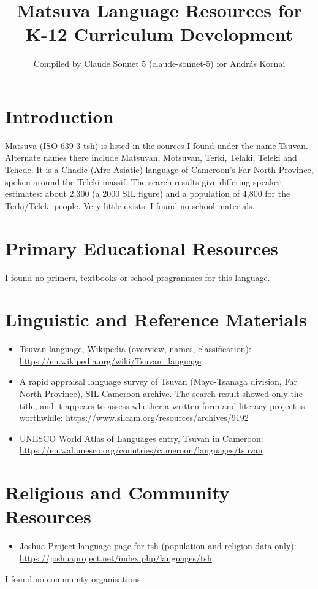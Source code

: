 \documentclass[12pt]{article}
\title{Matsuva Language Resources for K-12 Curriculum Development}
\author{Compiled by Claude Sonnet 5 (claude-sonnet-5) for Andr\'as Kornai}
\date{}
\begin{document}
\maketitle

\section{Introduction}
Matsuva (ISO 639-3 tsh) is listed in the sources I found under the name Tsuvan. Alternate names there include Matsuvan, Motsuvan, Terki, Telaki, Teleki and Tchede. It is a Chadic (Afro-Asiatic) language of Cameroon's Far North Province, spoken around the Teleki massif. The search results give differing speaker estimates: about 2,300 (a 2000 SIL figure) and a population of 4,800 for the Terki/Teleki people. Very little exists. I found no school materials.

\section{Primary Educational Resources}
I found no primers, textbooks or school programmes for this language.

\section{Linguistic and Reference Materials}
\begin{itemize}
\item Tsuvan language, Wikipedia (overview, names, classification): \url{https://en.wikipedia.org/wiki/Tsuvan_language}
\item A rapid appraisal language survey of Tsuvan (Mayo-Tsanaga division, Far North Province), SIL Cameroon archive. The search result showed only the title, and it appears to assess whether a written form and literacy project is worthwhile: \url{https://www.silcam.org/resources/archives/9192}
\item UNESCO World Atlas of Languages entry, Tsuvan in Cameroon: \url{https://en.wal.unesco.org/countries/cameroon/languages/tsuvan}
\end{itemize}

\section{Religious and Community Resources}
\begin{itemize}
\item Joshua Project language page for tsh (population and religion data only): \url{https://joshuaproject.net/index.php/languages/tsh}
\end{itemize}
I found no community organisations.
\end{document}
